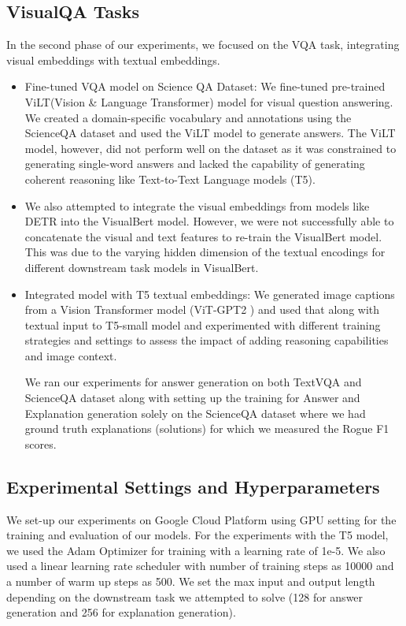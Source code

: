 \documentclass[10pt,twocolumn,letterpaper]{article}
\begin{document}
\subsection{VisualQA Tasks}

In the second phase of our experiments, we focused on the VQA task, integrating visual embeddings with textual embeddings.
\begin{itemize}

\item Fine-tuned VQA model on Science QA Dataset: We fine-tuned pre-trained ViLT(Vision \& Language Transformer) model for visual question answering. We created a domain-specific vocabulary and annotations using the ScienceQA dataset and used the ViLT model to generate answers. The ViLT model, however, did not perform well on the dataset as it was constrained to generating single-word answers and lacked the capability of generating coherent reasoning like Text-to-Text Language models (T5).

\item We also attempted to integrate the visual embeddings from models like DETR into the VisualBert model. However, we were not successfully able to concatenate the visual and text features to re-train the VisualBert model. This was due to the varying hidden dimension of the textual encodings for different downstream task models in VisualBert.
  
\item Integrated model with T5 textual embeddings: We generated image captions from a Vision Transformer model (ViT-GPT2 \cite{huggingface2021vit}) and  used that along with textual input to T5-small model and experimented with different training strategies and settings to assess the impact of adding reasoning capabilities and image context. 

We ran our experiments for answer generation on both TextVQA and ScienceQA dataset along with setting up the training for Answer and Explanation generation solely on the ScienceQA dataset where we had ground truth explanations (solutions) for which we measured the Rogue F1 scores.
\end{itemize}

\subsection{Experimental Settings and Hyperparameters}
We set-up our experiments on Google Cloud Platform using GPU setting for the training and evaluation of our models. For the experiments with the T5 model, we used the Adam Optimizer for training with a learning rate of 1e-5. We also used a linear learning rate scheduler with number of training steps as 10000 and a number of warm up steps as 500. We set the max input and output length depending on the downstream task we attempted to solve (128 for answer generation and 256 for explanation generation). 
\end{document}
